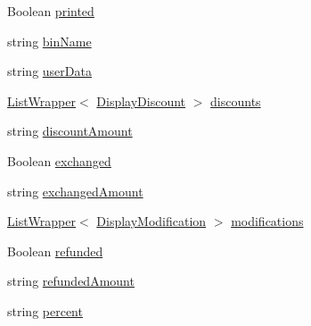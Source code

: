 \begin{DoxyCompactItemize}
\item 
Boolean \hyperlink{classcom_1_1clover_1_1remote_1_1order_1_1_display_line_item_af974a1f6165831f906cd71ee3a634ae8}{printed}
\item 
string \hyperlink{classcom_1_1clover_1_1remote_1_1order_1_1_display_line_item_a52ed2a1d21210d56c74ca7a7f9689d5e}{bin\+Name}
\item 
string \hyperlink{classcom_1_1clover_1_1remote_1_1order_1_1_display_line_item_a71d721c74156b5bab1068bf29540300c}{user\+Data}
\item 
\hyperlink{classcom_1_1clover_1_1remote_1_1order_1_1_list_wrapper}{List\+Wrapper}$<$ \hyperlink{classcom_1_1clover_1_1remote_1_1order_1_1_display_discount}{Display\+Discount} $>$ \hyperlink{classcom_1_1clover_1_1remote_1_1order_1_1_display_line_item_ad900c5cebdcd9af59ea46ad07b0179b5}{discounts}
\item 
string \hyperlink{classcom_1_1clover_1_1remote_1_1order_1_1_display_line_item_a69604ed923bcdfebcefcc9d877eee2bd}{discount\+Amount}
\item 
Boolean \hyperlink{classcom_1_1clover_1_1remote_1_1order_1_1_display_line_item_ac8a31bf6764477c1bb4df6b777e354d2}{exchanged}
\item 
string \hyperlink{classcom_1_1clover_1_1remote_1_1order_1_1_display_line_item_aff0862d02886a38e53d99dbad4973a0f}{exchanged\+Amount}
\item 
\hyperlink{classcom_1_1clover_1_1remote_1_1order_1_1_list_wrapper}{List\+Wrapper}$<$ \hyperlink{classcom_1_1clover_1_1remote_1_1order_1_1_display_modification}{Display\+Modification} $>$ \hyperlink{classcom_1_1clover_1_1remote_1_1order_1_1_display_line_item_afa50bc18d34354f531448aa879ea0bc5}{modifications}
\item 
Boolean \hyperlink{classcom_1_1clover_1_1remote_1_1order_1_1_display_line_item_a2fdeee5eead9ddc6657a73f509961b15}{refunded}
\item 
string \hyperlink{classcom_1_1clover_1_1remote_1_1order_1_1_display_line_item_a55cbfbd642ecac662af0a2dbfd53a29f}{refunded\+Amount}
\item 
string \hyperlink{classcom_1_1clover_1_1remote_1_1order_1_1_display_line_item_a734b60607631bc56105f2f2574712c16}{percent}
\end{DoxyCompactItemize}


